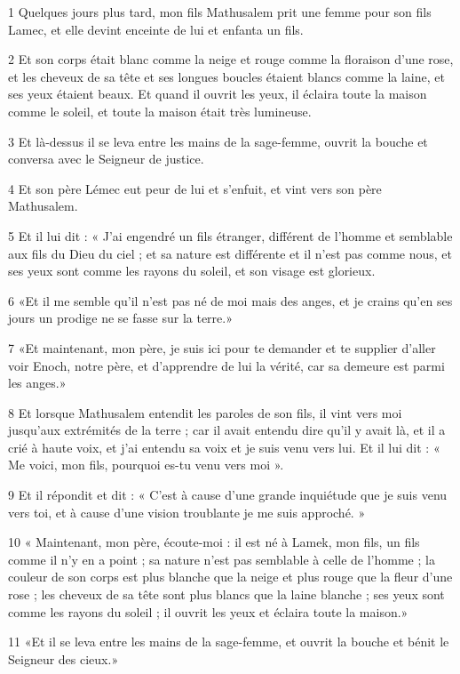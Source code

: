 \par 1 Quelques jours plus tard, mon fils Mathusalem prit une femme pour son fils Lamec, et elle devint enceinte de lui et enfanta un fils.
\par 2 Et son corps était blanc comme la neige et rouge comme la floraison d'une rose, et les cheveux de sa tête et ses longues boucles étaient blancs comme la laine, et ses yeux étaient beaux. Et quand il ouvrit les yeux, il éclaira toute la maison comme le soleil, et toute la maison était très lumineuse.
\par 3 Et là-dessus il se leva entre les mains de la sage-femme, ouvrit la bouche et conversa avec le Seigneur de justice.
\par 4 Et son père Lémec eut peur de lui et s'enfuit, et vint vers son père Mathusalem.
\par 5 Et il lui dit : « J'ai engendré un fils étranger, différent de l'homme et semblable aux fils du Dieu du ciel ; et sa nature est différente et il n'est pas comme nous, et ses yeux sont comme les rayons du soleil, et son visage est glorieux.
\par 6 «Et il me semble qu'il n'est pas né de moi mais des anges, et je crains qu'en ses jours un prodige ne se fasse sur la terre.»
\par 7 «Et maintenant, mon père, je suis ici pour te demander et te supplier d'aller voir Enoch, notre père, et d'apprendre de lui la vérité, car sa demeure est parmi les anges.»
\par 8 Et lorsque Mathusalem entendit les paroles de son fils, il vint vers moi jusqu'aux extrémités de la terre ; car il avait entendu dire qu'il y avait là, et il a crié à haute voix, et j'ai entendu sa voix et je suis venu vers lui. Et il lui dit : « Me voici, mon fils, pourquoi es-tu venu vers moi ».
\par 9 Et il répondit et dit : « C'est à cause d'une grande inquiétude que je suis venu vers toi, et à cause d'une vision troublante je me suis approché. »
\par 10 « Maintenant, mon père, écoute-moi : il est né à Lamek, mon fils, un fils comme il n'y en a point ; sa nature n'est pas semblable à celle de l'homme ; la couleur de son corps est plus blanche que la neige et plus rouge que la fleur d'une rose ; les cheveux de sa tête sont plus blancs que la laine blanche ; ses yeux sont comme les rayons du soleil ; il ouvrit les yeux et éclaira toute la maison.»
\par 11 «Et il se leva entre les mains de la sage-femme, et ouvrit la bouche et bénit le Seigneur des cieux.»
